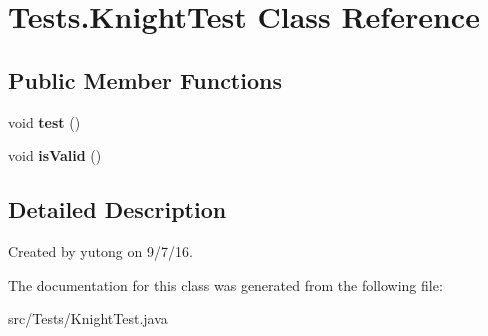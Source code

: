 \hypertarget{classTests_1_1KnightTest}{\section{Tests.\-Knight\-Test Class Reference}
\label{classTests_1_1KnightTest}
}
\subsection*{Public Member Functions}
\begin{DoxyCompactItemize}
\item 
\hypertarget{classTests_1_1KnightTest_a2172506c678c6551441630b290ff3856}{void {\bfseries test} ()}\label{classTests_1_1KnightTest_a2172506c678c6551441630b290ff3856}

\item 
\hypertarget{classTests_1_1KnightTest_ab5fc6398bec86b9761e731248092c7cd}{void {\bfseries is\-Valid} ()}\label{classTests_1_1KnightTest_ab5fc6398bec86b9761e731248092c7cd}

\end{DoxyCompactItemize}


\subsection{Detailed Description}
Created by yutong on 9/7/16. 

The documentation for this class was generated from the following file\-:\begin{DoxyCompactItemize}
\item 
src/\-Tests/Knight\-Test.\-java\end{DoxyCompactItemize}
